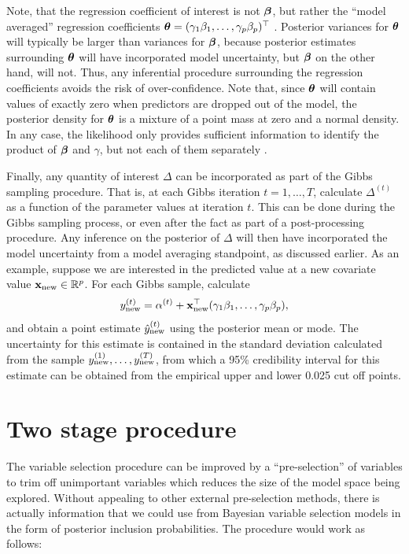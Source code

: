 \documentclass[showframe,11pt,twoside,openright]{report}
\begin{document}
Note, that the regression coefficient of interest is not ${\bm\beta}$, but rather the ``model averaged'' regression coefficients ${\bm\theta} = (\gamma_1\beta_1,\dots,\gamma_p\beta_p)^\top$ \citep{madigan1994model}.
Posterior variances for ${\bm\theta}$ will typically be larger than variances for ${\bm\beta}$, because posterior estimates surrounding ${\bm\theta}$ will have incorporated model uncertainty, but ${\bm\beta}$ on the other hand, will not.
Thus, any inferential procedure surrounding the regression coefficients avoids the risk of over-confidence.
Note that, since ${\bm\theta}$ will contain values of exactly zero when predictors are dropped out of the model, the posterior density for ${\bm\theta}$ is a mixture of a point mass at zero and a normal density.
In any case, the likelihood only provides sufficient information to identify the product of ${\bm\beta}$ and $\gamma$, but not each of them separately \citep{Kuo1998}.

Finally, any quantity of interest $\Delta$ can be incorporated as part of the Gibbs sampling procedure.
That is, at each Gibbs iteration $t=1,\dots,T$, calculate $\Delta^{(t)}$ as a function of the parameter values at iteration $t$.
This can be done during the Gibbs sampling process, or even after the fact as part of a post-processing procedure.
Any inference on the posterior of $\Delta$ will then have incorporated the model uncertainty from a model averaging standpoint, as discussed earlier.
As an example, suppose we are interested in the predicted value at a new covariate value ${\mathbf x}_\text{new} \in \mathbb{R}^p$.
For each Gibbs sample, calculate
\[
  y_{\text{new}}^{(t)} = \alpha^{(t)} + {\mathbf x}_\text{new}^\top (\gamma_1\beta_1,\dots,\gamma_p\beta_p),
\]
and obtain a point estimate $\hat y_{\text{new}}^{(t)}$ using the posterior mean or mode.
The uncertainty for this estimate is contained in the standard deviation calculated from the sample $y_{\text{new}}^{(1)},\dots,y_{\text{new}}^{(T)}$, from which a 95\% credibility interval for this estimate can be obtained from the empirical upper and lower 0.025 cut off points.

\section{Two stage procedure}

The variable selection procedure can be improved by a ``pre-selection'' of variables to trim off unimportant variables which reduces the size of the model space being explored.
Without appealing to other external pre-selection methods, there is actually information that we could use from Bayesian variable selection models in the form of posterior inclusion probabilities.
The procedure would work as follows:
\end{document}
